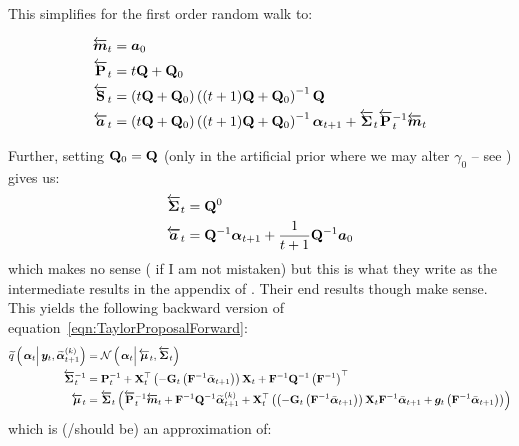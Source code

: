 This simplifies for the first order random walk to:

\begin{equation}\begin{split}
	\vecLarrow{m}_t &= \vec{a}_0 \\
%
	\matLarrow{P}_t &= t\mat{Q} + \mat{Q}_0 \\
%
	\matLarrow{S}_t &= 
		\Lparen{t\mat{Q} + \mat{Q}_0}
		\Lparen{(t+1)\mat{Q} + \mat{Q}_0}^{-1}\mat{Q} \\
%
	\vecLarrow{a}_t &= 
		\Lparen{t\mat{Q} + \mat{Q}_0}
		\Lparen{(t+1)\mat{Q} + \mat{Q}_0}^{-1}\vec{\alpha}_{t+1} 
		+ \matLarrow{\Sigma}_t\matLarrow{P}_t^{-1} \vecLarrow{m}_t
\end{split}\end{equation}

Further, setting $\mathbf{Q}_0 = \mathbf{Q}$ (only in the artificial prior where we may alter $\gamma_0$ -- see \citet[page 70]{briers10}) gives us:
%
\begin{equation}\begin{split}
	\matLarrow{\Sigma}_t &= 
		\mat{Q}^0 \\
%
	\vecLarrow{a}_t &= 
		\mat{Q}^{-1}\vec{\alpha}_{t+1}
		+ \frac{1}{t + 1}\mat{Q}^{-1}  \vec{a}_0
\end{split}\end{equation}
%
%
which makes no sense ( if I am not mistaken) but this is what they write as the intermediate results in the appendix of \cite{fearnhead10}. Their end results though make sense. This yields the following backward version of equation~\eqref{eqn:TaylorProposalForward}:
%
\begin{equation}\label{eqn:TaylorProposalForward}\begin{split}
	\IDAproxC{\vec{\alpha}_t}{\vec{y}_t, \particB{\vec{\alpha}}{t + 1}{k}} &=   %
		\normalC{\vec{\alpha}_t}{\vecLarrow{\mu}_t}{\matLarrow{\Sigma}_t} \\
%
	\matLarrow{\Sigma}_t^{-1} &= 
		\mat{P}_t^{-1} + 
		\mat{X}_t^\top\Lparen{-\mat{G}_t\Lparen{\mat{F}^{-1}\vecb{\alpha}_{t + 1}}}
		\mat{X}_t + \mat{F}^{-1}\mat{Q}^{-1}\Lparen{\mat{F}^{-1}}^\top  \\
%
	\vecLarrow{\mu}_t 
	 &=  \matLarrow{\Sigma}_t \Lparen{
		\matLarrow{P}_t^{-1}\vecLarrow{m}_t + 
		\mat{F}^{-1}\mat{Q}^{-1}\particB{\vec{\alpha}}{t + 1}{k} + 
		\mat{X}_t^\top
		\Lparen{
			\Lparen{-\mat{G}_t\Lparen{\mat{F}^{-1}\vecb{\alpha}_{t + 1}}}
			\mat{X}_t\mat{F}^{-1}\vecb{\alpha}_{t + 1} +
			\vec{g}_t\Lparen{\mat{F}^{-1}\vecb{\alpha}_{t + 1}}
		}}
\end{split}\end{equation}
%
%
which is (/should be) an approximation of:

